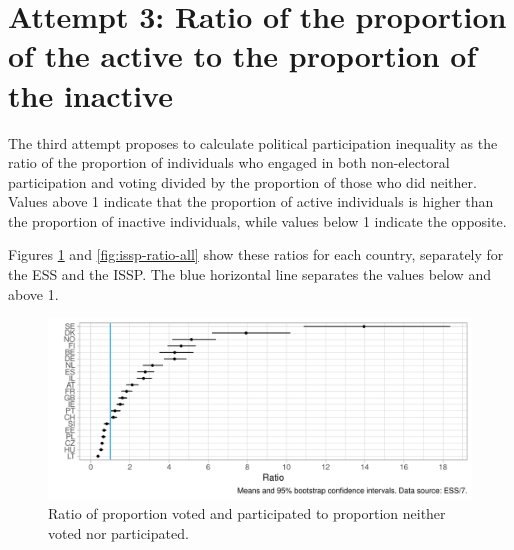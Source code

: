 \documentclass[12pt,]{article}
\begin{document}
\hypertarget{attempt-3-ratio-of-the-proportion-of-the-active-to-the-proportion-of-the-inactive}{%
\section{Attempt 3: Ratio of the proportion of the active to the proportion of the inactive}\label{attempt-3-ratio-of-the-proportion-of-the-active-to-the-proportion-of-the-inactive}}

The third attempt proposes to calculate political participation inequality as the ratio of the proportion of individuals who engaged in both non-electoral participation and voting divided by the proportion of those who did neither. Values above 1 indicate that the proportion of active individuals is higher than the proportion of inactive individuals, while values below 1 indicate the opposite.

Figures \ref{fig:ess-ratio-all} and \ref{fig:issp-ratio-all} show these ratios for each country, separately for the ESS and the ISSP. The \textcolor{Cerulean}{blue} horizontal line separates the values below and above 1.

\begin{figure}[H]

{\centering \includegraphics{report_files/figure-latex/ess-ratio-all-1} 

}

\caption{Ratio of proportion voted and participated to proportion neither voted nor participated.}\label{fig:ess-ratio-all}
\end{figure}
\end{document}
